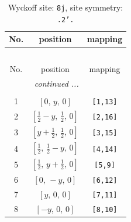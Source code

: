 \documentclass[fleqn,8pt]{jsarticle}
\begin{document}
\begin{longtable}{ccc}
\caption{Wyckoff site: {\tt 8j}, site symmetry: {\tt .2'.}}
 \\
 \hline \hline
No. & position & mapping \\ \hline \endfirsthead

\multicolumn{2}{l}{\tablename\ \thetable{}} \\
 \hline \hline
No. & position & mapping \\ \hline \endhead

 \hline \hline
\multicolumn{2}{r}{\footnotesize\it continued ...} \\ \endfoot

 \hline \hline
\multicolumn{2}{r}{} \\ \endlastfoot

1 & $\left[ 0,\, y,\, 0 \right]$ & {\tt [1,13]} \\ \hline
2 & $\left[ \frac{1}{2} - y,\, \frac{1}{2},\, 0 \right]$ & {\tt [2,16]} \\ \hline
3 & $\left[ y + \frac{1}{2},\, \frac{1}{2},\, 0 \right]$ & {\tt [3,15]} \\ \hline
4 & $\left[ \frac{1}{2},\, \frac{1}{2} - y,\, 0 \right]$ & {\tt [4,14]} \\ \hline
5 & $\left[ \frac{1}{2},\, y + \frac{1}{2},\, 0 \right]$ & {\tt [5,9]} \\ \hline
6 & $\left[ 0,\, - y,\, 0 \right]$ & {\tt [6,12]} \\ \hline
7 & $\left[ y,\, 0,\, 0 \right]$ & {\tt [7,11]} \\ \hline
8 & $\left[ - y,\, 0,\, 0 \right]$ & {\tt [8,10]} \\
\end{longtable}
\renewcommand{\arraystretch}{1.2}
\end{document}
